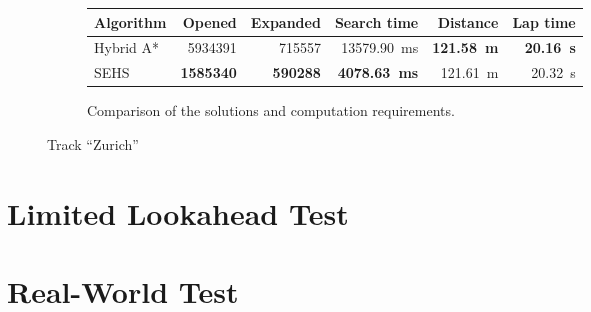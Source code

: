 \begin{figure}[!tbp]
	\vspace{0.75cm}
	
	\begin{subfigure}[t]{\textwidth}
		\centering
		\begin{tabular}{l r r r r r}%
			\toprule
			Algorithm & Opened & Expanded & Search time & Distance & Lap time \\
			\midrule
			Hybrid A* & \num{5934391} & \num{715557} & \SI{13579.90}{\milli\second} & \textbf{\SI{121.58}{\meter}} & \textbf{\SI{20.16}{\second}} \\
			SEHS & \textbf{\num{1585340}} & \textbf{\num{590288}} & \textbf{\SI{4078.63}{\milli\second}} & \SI{121.61}{\meter} & \SI{20.32}{\second} \\
			\bottomrule
		\end{tabular}
		\caption{Comparison of the solutions and computation requirements.}
		\label{table:zurich}
	\end{subfigure}
	
	\vspace{0.75cm}

	\caption{Track ``Zurich''}
\end{figure}

\section{Limited Lookahead Test}


\section{Real-World Test}

